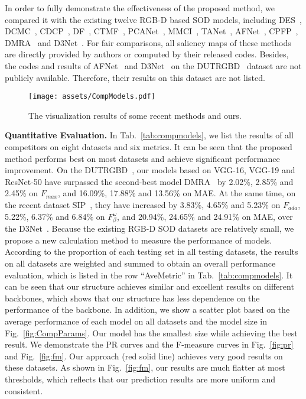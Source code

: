 \documentclass[runningheads]{llncs}
\begin{document}
In order to fully demonstrate the effectiveness of the proposed method, we compared it with the existing twelve RGB-D based SOD models, including DES~\cite{DES}, DCMC~\cite{DCMC}, CDCP~\cite{CDCP}, DF~\cite{DF}, CTMF~\cite{CTMF}, PCANet~\cite{PCANet}, MMCI~\cite{MMCI}, TANet~\cite{TANet}, AFNet~\cite{AFNetRGBD}, CPFP~\cite{CPFP}, DMRA~\cite{DUTRGBD} and D3Net~\cite{SIP}. For fair comparisons, all saliency maps of these methods are directly provided by authors or computed by their released codes. Besides, the codes and results of AFNet~\cite{AFNetRGBD} and D3Net~\cite{SIP} on the DUTRGBD~\cite{DUTRGBD} dataset are not publicly available. Therefore, their results on this dataset are not listed.

\begin{figure}[t]
 \begin{center}
  \texttt{[image: assets/CompModels.pdf]}
  \caption{The visualization results of some recent methods and ours.}
  \label{fig:CompModels}
 \end{center}
\end{figure}

\noindent\textbf{Quantitative Evaluation.}
In Tab.~\ref{tab:compmodels}, we list the results of all competitors on eight datasets and six metrics. It can be seen that the proposed method performs best on most datasets and achieve significant performance improvement.
On the DUTRGBD~\cite{DUTRGBD}, our models based on VGG-16, VGG-19 and ResNet-50 have surpassed the second-best model DMRA~\cite{DUTRGBD} by 2.02\%, 2.85\% and 2.45\% on $F_{max}$, and 16.09\%, 17.88\% and 13.56\% on MAE. At the same time, on the recent dataset SIP~\cite{SIP}, they have increased by 3.83\%, 4.65\% and 5.23\% on $F_{ada}$, 5.22\%, 6.37\% and 6.84\% on $F^{\omega}_{\beta}$, and 20.94\%, 24.65\% and 24.91\% on MAE, over the D3Net~\cite{SIP}.
Because the existing RGB-D SOD datasets are relatively small, we propose a new calculation method to measure the performance of models. According to the proportion of each testing set in all testing datasets, the results on all datasets are weighted and summed to obtain an overall performance evaluation, which is listed in the row ``AveMetric'' in Tab.~\ref{tab:compmodels}.
It can be seen that our structure achieves similar and excellent results on different backbones, which shows that our structure has less dependence on the performance of the backbone.
In addition, we show a scatter plot based on the average performance of each model on all datasets and the model size in Fig.~\ref{fig:CompParams}. Our model has the smallest size while achieving the best result. We demonstrate the PR curves and the F-measure curves in Fig.~\ref{fig:pr} and Fig.~\ref{fig:fm}. Our approach (red solid line) achieves very good results on these datasets. As shown in Fig.~\ref{fig:fm}, our results are much flatter at most thresholds, which reflects that our prediction results are more uniform and consistent.
\end{document}
